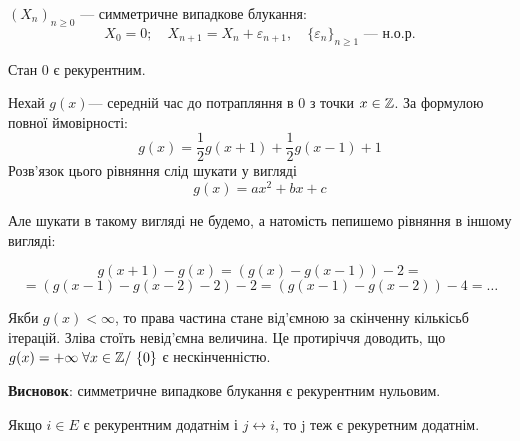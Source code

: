 \begin{example}
  $\left( X_n \right) _{n\geq 0}$ --- симметричне випадкове блукання:
  \[ X_0 = 0; \quad X_{n+1} = X_n + \varepsilon _{n+1}, \quad \{\varepsilon_n\} _{n\geq 1} \text{ --- н.о.р.} \] 

  Стан $ 0$ є рекурентним.

  Нехай $g(x)$--- середній час до потрапляння в 0 з точки $x \in \mathbb{Z}$.
  За формулою повної ймовірності:
  \[ g(x) = \frac{1}{2}g(x+1) + \frac{1}{2} g(x - 1) + 1 \] 
  Розв'язок цього рівняння слід шукати у вигляді 
  \[ g(x) = ax^2 + bx + c \] 

  Але шукати в такому вигляді не будемо, а натомість пепишемо рівняння в іншому вигляді:

  \[ g(x+1) - g(x) = (g(x) - g(x-1)) - 2 = \] 
  \[ = \left( g(x-1) - g(x-2) - 2 \right) -2 = (g(x-1) - g(x-2)) - 4 = \ldots \] 

  Якби $g(x) < \infty$, то права частина стане від'ємною за скінченну кількісьб ітерацій.
  Зліва стоїть невід'ємна величина.
  Це протиріччя доводить, що $g(x) = +\infty \; \forall x \in \mathbb{Z} /\ \{0\} $ є нескінченністю.

  \textbf{Висновок}: симметричне випадкове блукання є рекурентним нульовим.
\end{example}

\begin{theorem}
  Якщо $i \in E$ є рекурентним додатнім і $j \leftrightarrow i$, то j теж є рекуретним додатнім.
\end{theorem}


